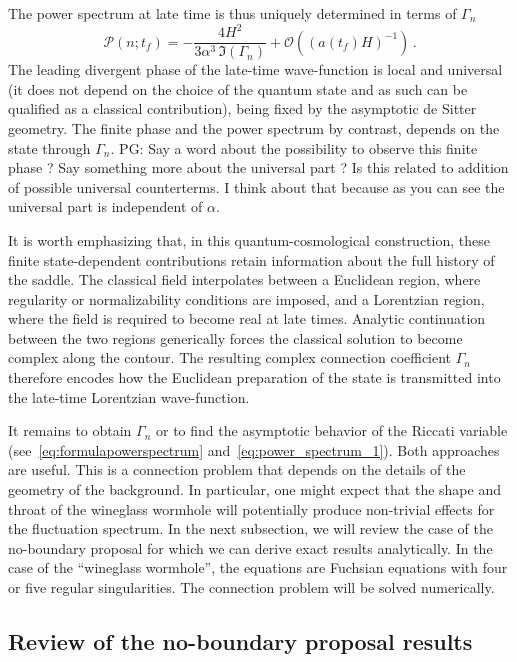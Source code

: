 \documentclass[a4paper,11pt]{article}
\newcommand{\purple}[1]{{\color{purple} #1 \color{black}}}
\newcommand{\PG}[1]{{\purple{PG: #1}}} %
\begin{document}
The power spectrum at late time is thus uniquely determined in terms of $\Gamma_n$
\begin{equation}\label{eq:formulapowerspectrum}
    \mathcal{P}(n;t_f)=-\frac{4H^2}{3\alpha^3\,\Im\left(\Gamma_n\right)}+\mathcal{O}\left((a(t_f)H)^{-1}\right)\,.
\end{equation}
The leading divergent phase of the late-time wave-function is local and universal (it does not depend on the choice of the quantum state and as such can be qualified as a classical contribution), being fixed by the asymptotic de Sitter geometry. The finite phase and the power spectrum by contrast, depends on the state through $\Gamma_n$. \PG{Say a word about the possibility to observe this finite phase ? Say something more about the universal part ? Is this related to addition of possible universal counterterms. I think about that because as you can see the universal part is independent of $\alpha$.}

It is worth emphasizing that, in this quantum-cosmological construction, these finite state-dependent contributions retain information about the full history of the saddle. The classical field interpolates between a Euclidean region, where regularity or normalizability conditions are imposed, and a Lorentzian region, where the field is required to become real at late times. Analytic continuation between the two regions generically forces the classical solution to become complex along the contour. The resulting complex connection coefficient $\Gamma_n$ therefore encodes how the Euclidean preparation of the state is transmitted into the late-time Lorentzian wave-function.

It remains to obtain $\Gamma_n$ or to find the asymptotic behavior of the Riccati variable (see~\eqref{eq:formulapowerspectrum} and~\eqref{eq:power_spectrum_1}). Both approaches are useful. This is a connection problem that depends on the details of the geometry of the background. In particular, one might expect that the shape and throat of the wineglass wormhole will potentially produce non-trivial effects for the fluctuation spectrum. In the next subsection, we will review the case of the no-boundary proposal for which we can derive exact results analytically. In the case of the ``wineglass wormhole'', the equations are Fuchsian equations with four or five regular singularities. The connection problem will be solved numerically.

\subsection{Review of the no-boundary proposal results}\label{subsec:noboundary}
\end{document}

